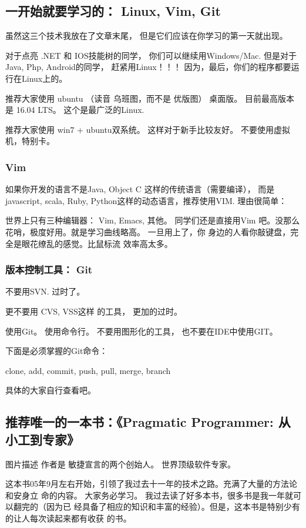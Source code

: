 \documentclass[11pt]{ctexart}
\begin{document}
{{{{\subsection{一开始就要学习的： Linux, Vim, Git}
\label{sec:org97c742e}
虽然这三个技术我放在了文章末尾， 但是它们应该在你学习的第一天就出现。

对于点亮 .NET 和 IOS技能树的同学， 你们可以继续用Windows/Mac. 但是对于Java, Php,
Android的同学， 赶紧用Linux！！！ 因为，最后，你们的程序都要运行在Linux上的。


推荐大家使用 ubuntu （读音 乌班图，而不是 优版图） 桌面版。 目前最高版本是 16.04
LTS。 这个是最广泛的Linux.


推荐大家使用 win7 + ubuntu双系统。 这样对于新手比较友好。 不要使用虚拟机，特别卡。

\subsubsection{Vim}
\label{sec:org552e51b}
如果你开发的语言不是Java, Object C 这样的传统语言（需要编译）， 而是 javascript,
scala, Ruby, Python这样的动态语言，推荐使用VIM. 理由很简单：


世界上只有三种编辑器： Vim, Emacs, 其他。
同学们还是直接用Vim 吧。没那么花哨，极度好用。就是学习曲线略高。 一旦用上了，你
身边的人看你敲键盘，完全是眼花缭乱的感觉。比鼠标流 效率高太多。


\subsubsection{版本控制工具： Git}
\label{sec:orged50dff}
不要用SVN. 过时了。

更不要用 CVS, VSS这样 的工具， 更加的过时。

使用Git。 使用命令行。 不要用图形化的工具， 也不要在IDE中使用GIT。

下面是必须掌握的Git命令：

clone, add, commit, push, pull, merge, branch

具体的大家自行查看吧。

\subsection{推荐唯一的一本书：《Pragmatic Programmer: 从小工到专家》}
\label{sec:org2f53c94}
图片描述
作者是 敏捷宣言的两个创始人。 世界顶级软件专家。

这本书05年9月左右开始，引领了我过去十一年的技术之路。充满了大量的方法论和安身立
命的内容。 大家务必学习。 我过去读了好多本书，很多书是我一年就可以翻完的（因为已
经具备了相应的知识和丰富的经验）。但是，这本书是特别少有的让人每次读起来都有收获
的书。


}}}}
\end{document}
